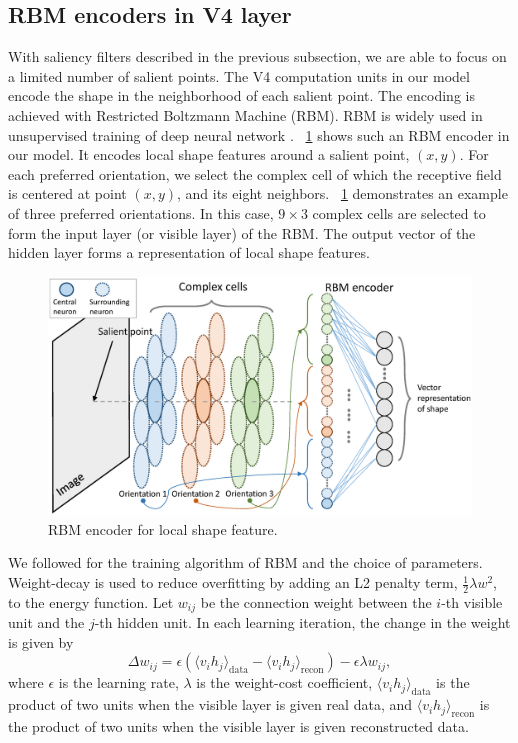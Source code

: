 \documentclass[9pt,twocolumn]{article}
\begin{document}
\subsection{RBM encoders in V4 layer}

With saliency filters described in the previous subsection, we are able to focus on a limited number of salient points.
The V4 computation units in our model encode the shape in the neighborhood of each salient point.
The encoding is achieved with Restricted Boltzmann Machine (RBM).
RBM is widely used in unsupervised training of deep neural network \cite{bengio2009}.
\figurename~\ref{fig:6} shows such an RBM encoder in our model.
It encodes local shape features around a salient point, $(x,y)$.
For each preferred orientation, we select the complex cell of which the receptive field is centered at point $(x,y)$, and its eight neighbors.
\figurename~\ref{fig:6} demonstrates an example of three preferred orientations.
In this case, $9\times3$ complex cells are selected to form the input layer (or visible layer) of the RBM.
The output vector of the hidden layer forms a representation of local shape features.

\begin{figure}
\centerline{\includegraphics[width=0.99\linewidth]{images/fig6.eps}} 
\caption{RBM encoder for local shape feature.}
\label{fig:6}
\end{figure}

We followed \cite{hinton2010} for the training algorithm of RBM and the choice of parameters.
Weight-decay is used to reduce overfitting by adding an L2 penalty term, $\frac{1}{2}\lambda w^2$, to the energy function.
Let $w_{ij}$ be the connection weight between the $i$-th visible unit and the $j$-th hidden unit.
In each learning iteration, the change in the weight is given by
\begin{equation}
\Delta w_{ij}=\epsilon\left(\langle v_i h_j\rangle_\text{data}-\langle v_i h_j\rangle_\text{recon}\right)
-\epsilon\lambda w_{ij},
\end{equation}
where $\epsilon$ is the learning rate, $\lambda$ is the weight-cost coefficient,
$\langle v_i h_j\rangle_\text{data}$ is the product of two units when the visible layer is given real data,
and $\langle v_i h_j\rangle_\text{recon}$ is the product of two units when the visible layer is given reconstructed data.
\end{document}
